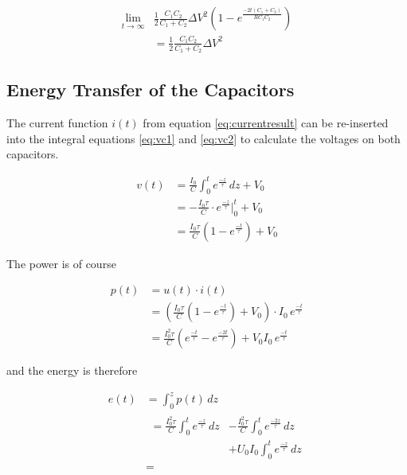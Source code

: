 \begin{align}
    \lim_{t\to\infty} & \frac{1}{2} \frac{C_1C_2}{C_1+C_2} {\Delta V}^2 \left(1 - e^{\frac{-2t\left(C_1+C_2\right)}{RC_1C_2}}\right) \\
    &= \frac{1}{2} \frac{C_1C_2}{C_1+C_2} {\Delta V}^2 \label{eq:finalresult}
\end{align}

\subsection{Energy Transfer of the Capacitors}

The  current function  $i(t)$  from  equation  \ref{eq:currentresult}  can  be
re-inserted  into  the integral equations  \ref{eq:vc1}  and  \ref{eq:vc2}  to
calculate the voltages on both capacitors.

\begin{align}
    v(t) &= \frac{I_0}{C} \int_0^t e^\frac{-z}{\tau}\,dz + V_0\\
         &= -\frac{I_0\tau}{C} \cdot e^\frac{-z}{\tau} \bigg|_0^t + V_0 \\
         &= \frac{I_0\tau}{C}\left(1-e^\frac{-t}{\tau}\right) + V_0
\end{align}

The power is of course

\begin{align}
    p(t) &= u(t)\cdot i(t) \\
         &= \left( \frac{I_0\tau}{C}\left(1 - e^\frac{-t}{\tau}\right) + V_0 \right) \cdot I_0\,e^\frac{-t}{\tau} \\
         &= \frac{I_0^2\tau}{C}\left(e^\frac{-t}{\tau}-e^\frac{-2t}{\tau}\right) + V_0I_0\,e^\frac{-t}{\tau}
\end{align}

and the energy is therefore

\begin{align}
    e(t) &= \int_0^z p(t)\,dz \\
         & \begin{aligned}
            = \frac{I_0^2\tau}{C}\int_0^t e^\frac{-z}{\tau}\,dz &- \frac{I_0^2\tau}{C}\int_0^t e^\frac{-2z}{\tau}\,dz \\
                                                               &+ U_0I_0\int_0^t e^\frac{-z}{\tau}\,dz
        \end{aligned} \\
         &= 
\end{align}

